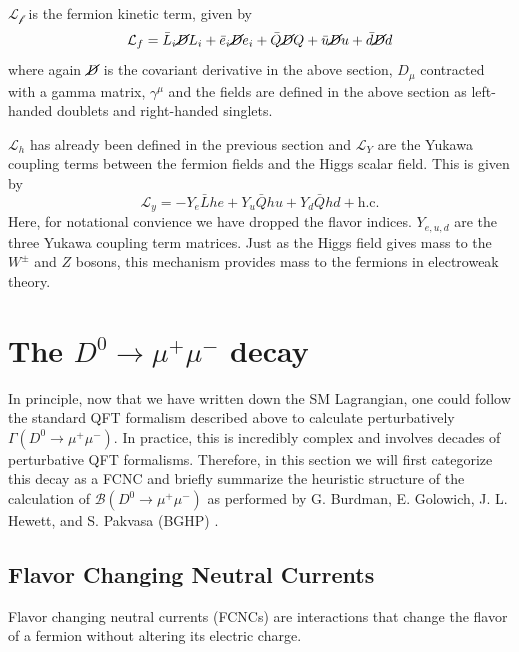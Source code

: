 $\mathcal{L_f}$ is the fermion kinetic term, given by
\begin{equation}
\mathcal{L}_{f} = \bar{L}_{i}\cancel{D}L_{i} + \bar{e}_{i}\cancel{D}e_{i} + \bar{Q}\cancel{D}Q + \bar{u} \cancel{D}u + \bar{d}\cancel{D}d
\label{eq:fermion_kinetic_term}
\end{equation}
where again $\cancel{D}$ is the covariant derivative in the above section, $D_\mu$ contracted with a gamma matrix, $\gamma^\mu$ and the fields are defined in the above section as left-handed doublets and right-handed singlets.

$\mathcal{L}_h$ has already been defined in the previous section and $\mathcal{L}_Y$ are the Yukawa coupling terms between the fermion fields and the Higgs scalar field. This is given by
\begin{equation}
\mathcal{L}_{y} = - Y_{e} \bar{L}he + Y_{u}\bar{Q}h u + Y_{d} \bar{Q}h d
 + \text{h.c.}
\end{equation}
Here, for notational convience we have dropped the flavor indices. $Y_{e,u,d}$ are the three Yukawa coupling term matrices. Just as the Higgs field gives mass to the $W^\pm$ and $Z$ bosons, this mechanism provides mass to the fermions in electroweak theory. 

\section{The $D^0 \to \mu^+ \mu^-$ decay}

In principle, now that we have written down the SM Lagrangian, one could follow the standard QFT formalism described above to calculate perturbatively $\Gamma(D^0 \to \mu^+ \mu^-)$. In practice, this is incredibly complex and involves decades of perturbative QFT formalisms. Therefore, in this section we will first categorize this decay as a FCNC and briefly summarize the heuristic structure of the calculation of $\mathcal{B}(D^0 \to \mu^+ \mu^-)$ as performed by G. Burdman, E. Golowich, J. L. Hewett, and S. Pakvasa (BGHP) \cite{ref:burdman_2002}.

\subsection{Flavor Changing Neutral Currents}

Flavor changing neutral currents (FCNCs) are interactions that change the flavor of a fermion without altering its electric charge. 

